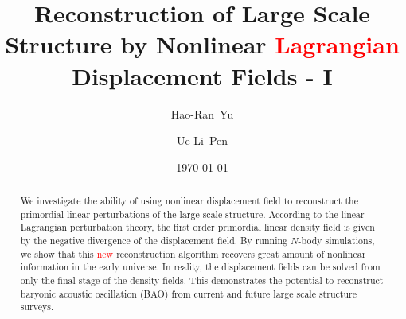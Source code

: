 \documentclass[aps,prd,twocolumn,superscriptaddress,amsfont,amssymb,amsmath,nofootinbib,showpacs,balancelastpage]{revtex4-1}
\newcommand{\tcr}{\textcolor{red}}
\begin{document}
\addtolength{\hoffset}{-0.525cm}
\addtolength{\textwidth}{1.05cm}
\title{Reconstruction of Large Scale Structure by Nonlinear \tcr{Lagrangian} Displacement Fields - I}

\author{Hao-Ran~Yu}%

\author{Ue-Li~Pen}%

\date{\today}

\begin{abstract}
We investigate the ability of using nonlinear displacement field to reconstruct 
the primordial linear perturbations of the large scale structure. According to 
the linear Lagrangian perturbation theory, the first order primordial linear 
density field is given by the negative divergence of the displacement field. By 
running $N$-body simulations, we show that this \tcr{new} reconstruction algorithm recovers 
great amount of nonlinear information in the early universe. In reality, the 
displacement fields can be solved from only the final stage of the density 
fields. This demonstrates the potential to reconstruct baryonic acoustic oscillation (BAO) 
from current and future large scale structure surveys.

\end{abstract}

\end{document}
